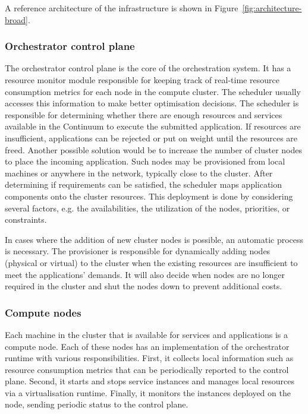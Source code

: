 A reference architecture of the infrastructure is shown in Figure~\ref{fig:architecture-broad}.

\subsubsection{Orchestrator control plane}

The orchestrator control plane is the core of the orchestration system. It has a resource monitor module responsible for keeping track of real-time resource consumption metrics for each node in the compute cluster. The scheduler usually accesses this information to make better optimisation decisions. The scheduler is responsible for determining whether there are enough resources and services available in the Continuum to execute the submitted application. If resources are insufficient, applications can be rejected or put on weight until the resources are freed. Another possible solution would be to increase the number of cluster nodes to place the incoming application. Such nodes may be provisioned from local machines or anywhere in the network, typically close to the cluster. After determining if requirements can be satisfied, the scheduler maps application components onto the cluster resources. This deployment is done by considering several factors, e.g. the availabilities, the utilization of the nodes, priorities, or constraints.

In cases where the addition of new cluster nodes is possible, an automatic process is necessary. The provisioner is responsible for dynamically adding nodes (physical or virtual) to the cluster when the existing resources are insufficient to meet the applications' demands. It will also decide when nodes are no longer required in the cluster and shut the nodes down to prevent additional costs.

\subsubsection{Compute nodes}

Each machine in the cluster that is available for services and applications is a compute node. Each of these nodes has an implementation of the orchestrator runtime with various responsibilities. First, it collects local information such as resource consumption metrics that can be periodically reported to the control plane. Second, it starts and stops service instances and manages local resources via a virtualisation runtime. Finally, it monitors the instances deployed on the node, sending periodic status to the control plane.

